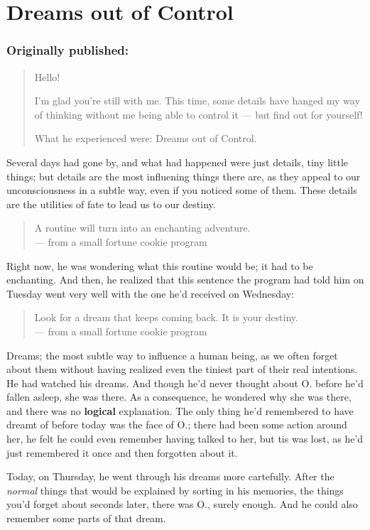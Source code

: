 \chapter{Dreams out of Control}
\label{cha:dreams-out-control}
\subsection*{Originally published: }
\begin{quote}
Hello!

I'm glad you're still with me. This time, some details have hanged my way of thinking without me being able to control it --- but find out for yourself!

What he experienced were: Dreams out of Control.
\end{quote}

Several days had gone by, and what had happened were just details, tiny little things; but details are the most influening things there are, as they appeal to our unconsciousness in a subtle way, even if you noticed some of them. These details are the utilities of fate to lead us to our destiny. 
\begin{verse}
A routine will turn into an enchanting adventure. \\
--- from a small fortune cookie program
\end{verse}
Right now, he was wondering what this routine would be; it had to be enchanting. And then, he realized that this sentence the program had told him on Tuesday went very well with the one he'd received on Wednesday: 
\begin{verse}
Look for a dream that keeps coming back. It is your destiny. \\
--- from a small fortune cookie program
\end{verse}
Dreams; the most subtle way to influence a human being, as we often forget about them without having realized even the tiniest part of their real intentions. He had watched his dreams. 
And though he'd never thought about O. before he'd fallen asleep, she was there. As a consequence, he wondered why she was there, and there was no \textbf{logical} explanation. The only thing he'd remembered to have dreamt of before today was the face of O.; there had been some action around her, he felt he could even remember having talked to her, but tis was lost, as he'd just remembered it once and then forgotten about it.

Today, on Thursday, he went through his dreams more cartefully. After the \emph{normal} things that would be explained by sorting in his memories, the things you'd forget about seconds later, there was O., surely enough. And he could also remember some parts of that dream.

